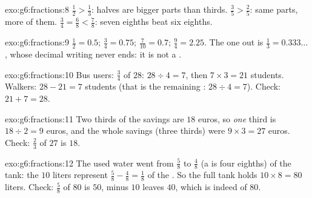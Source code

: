 \begin{solution}{exo:g6:fractions:8}
$\frac12 > \frac13$: halves are bigger parts than thirds.
$\frac35 > \frac25$: same parts, more of them.
$\frac34 = \frac68 < \frac78$: seven eighths beat six eighths.
\end{solution}

\begin{solution}{exo:g6:fractions:9}
$\frac12 = 0.5$; \quad $\frac34 = 0.75$; \quad
$\frac{7}{10} = 0.7$; \quad $\frac94 = 2.25$. The  one out is
$\frac13 = 0.333\dots$, whose decimal writing never ends: it is not a
.
\end{solution}

\begin{solution}{exo:g6:fractions:10}
Bus users: $\frac34$ of $28$: $28 \div 4 = 7$, then
$7 \times 3 = 21$ students. Walkers: $28 - 21 = 7$ students (that is
the remaining : $28 \div 4 = 7$). Check: $21 + 7 = 28$.
\end{solution}

\begin{solution}{exo:g6:fractions:11}
Two thirds of the savings are $18$ euros, so \emph{one} third is
$18 \div 2 = 9$ euros, and the whole savings (three thirds) were
$9 \times 3 = 27$ euros. Check: $\frac23$ of $27$ is $18$.
\end{solution}

\begin{solution}{exo:g6:fractions:12}
The used water went from $\frac58$ to $\frac48$ (a  is four
eighths) of the tank: the $10$ liters represent
$\frac58 - \frac48 = \frac18$ of the . So the full tank holds
$10 \times 8 = 80$ liters. Check: $\frac58$ of $80$ is $50$, minus
$10$ leaves $40$, which is indeed  of $80$.
\end{solution}

